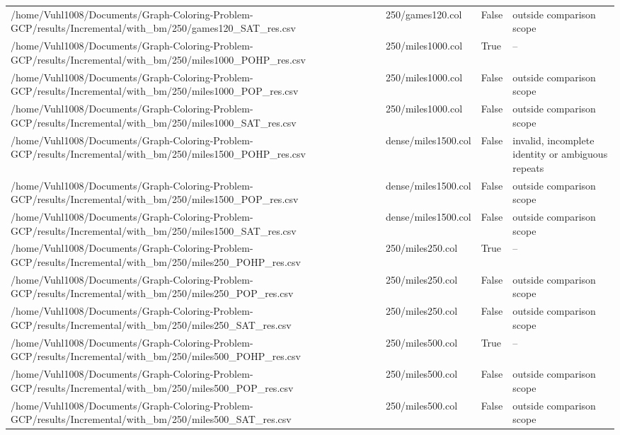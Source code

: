 \begin{table}[htbp]
\begin{tabular}{llll}
/home/Vuhl1008/Documents/Graph-Coloring-Problem-GCP/results/Incremental/with\_bm/250/games120\_SAT\_res.csv & 250/games120.col & False & outside comparison scope \\
/home/Vuhl1008/Documents/Graph-Coloring-Problem-GCP/results/Incremental/with\_bm/250/miles1000\_POHP\_res.csv & 250/miles1000.col & True & -- \\
/home/Vuhl1008/Documents/Graph-Coloring-Problem-GCP/results/Incremental/with\_bm/250/miles1000\_POP\_res.csv & 250/miles1000.col & False & outside comparison scope \\
/home/Vuhl1008/Documents/Graph-Coloring-Problem-GCP/results/Incremental/with\_bm/250/miles1000\_SAT\_res.csv & 250/miles1000.col & False & outside comparison scope \\
/home/Vuhl1008/Documents/Graph-Coloring-Problem-GCP/results/Incremental/with\_bm/250/miles1500\_POHP\_res.csv & dense/miles1500.col & False & invalid, incomplete identity or ambiguous repeats \\
/home/Vuhl1008/Documents/Graph-Coloring-Problem-GCP/results/Incremental/with\_bm/250/miles1500\_POP\_res.csv & dense/miles1500.col & False & outside comparison scope \\
/home/Vuhl1008/Documents/Graph-Coloring-Problem-GCP/results/Incremental/with\_bm/250/miles1500\_SAT\_res.csv & dense/miles1500.col & False & outside comparison scope \\
/home/Vuhl1008/Documents/Graph-Coloring-Problem-GCP/results/Incremental/with\_bm/250/miles250\_POHP\_res.csv & 250/miles250.col & True & -- \\
/home/Vuhl1008/Documents/Graph-Coloring-Problem-GCP/results/Incremental/with\_bm/250/miles250\_POP\_res.csv & 250/miles250.col & False & outside comparison scope \\
/home/Vuhl1008/Documents/Graph-Coloring-Problem-GCP/results/Incremental/with\_bm/250/miles250\_SAT\_res.csv & 250/miles250.col & False & outside comparison scope \\
/home/Vuhl1008/Documents/Graph-Coloring-Problem-GCP/results/Incremental/with\_bm/250/miles500\_POHP\_res.csv & 250/miles500.col & True & -- \\
/home/Vuhl1008/Documents/Graph-Coloring-Problem-GCP/results/Incremental/with\_bm/250/miles500\_POP\_res.csv & 250/miles500.col & False & outside comparison scope \\
/home/Vuhl1008/Documents/Graph-Coloring-Problem-GCP/results/Incremental/with\_bm/250/miles500\_SAT\_res.csv & 250/miles500.col & False & outside comparison scope \\

\end{tabular}
\end{table}
